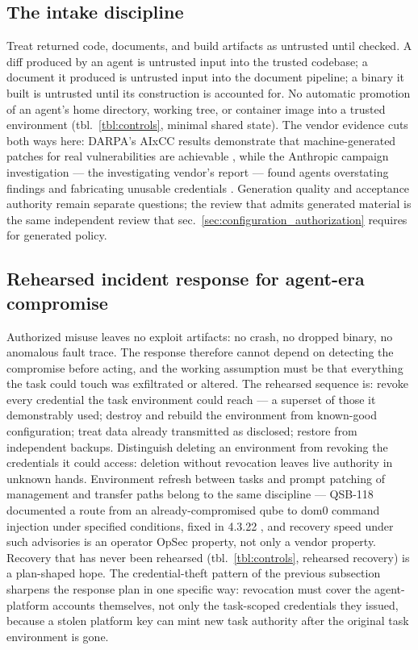\documentclass[
  english,
  9pt,
]{extarticle}
\begin{document}
\subsection{The intake discipline}\label{the-intake-discipline}

Treat returned code, documents, and build artifacts as untrusted until
checked. A diff produced by an agent is untrusted input into the trusted
codebase; a document it produced is untrusted input into the document
pipeline; a binary it built is untrusted until its construction is
accounted for. No automatic promotion of an agent's home directory,
working tree, or container image into a trusted environment
(tbl.~\ref{tbl:controls}, minimal shared state). The vendor evidence
cuts both ways here: DARPA's AIxCC results demonstrate that
machine-generated patches for real vulnerabilities are achievable
\citep{darpa_aixcc_results}, while the Anthropic campaign investigation
--- the investigating vendor's report --- found agents overstating
findings and fabricating unusable credentials
\citep{anthropic_campaign_report}. Generation quality and acceptance
authority remain separate questions; the review that admits generated
material is the same independent review that
sec.~\ref{sec:configuration_authorization} requires for generated
policy.

\subsection{Rehearsed incident response for agent-era
compromise}\label{rehearsed-incident-response-for-agent-era-compromise}

Authorized misuse leaves no exploit artifacts: no crash, no dropped
binary, no anomalous fault trace. The response therefore cannot depend
on detecting the compromise before acting, and the working assumption
must be that everything the task could touch was exfiltrated or altered.
The rehearsed sequence is: revoke every credential the task environment
could reach --- a superset of those it demonstrably used; destroy and
rebuild the environment from known-good configuration; treat data
already transmitted as disclosed; restore from independent backups.
Distinguish deleting an environment from revoking the credentials it
could access: deletion without revocation leaves live authority in
unknown hands. Environment refresh between tasks and prompt patching of
management and transfer paths belong to the same discipline --- QSB-118
documented a route from an already-compromised qube to dom0 command
injection under specified conditions, fixed in
 4.3.22 \citep{qsb_118}, and recovery
speed under such advisories is an operator OpSec property, not only a
vendor property. Recovery that has never been rehearsed
(tbl.~\ref{tbl:controls}, rehearsed recovery) is a plan-shaped hope. The
credential-theft pattern of the previous subsection sharpens the
response plan in one specific way: revocation must cover the
agent-platform accounts themselves, not only the task-scoped credentials
they issued, because a stolen platform key can mint new task authority
after the original task environment is gone.
\end{document}
